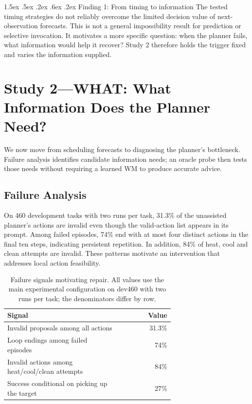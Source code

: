 \documentclass[runningheads]{llncs}
\makeatletter
\renewcommand\paragraph{\@startsection{paragraph}{4}{\z@}%
  {1.5ex \@plus .5ex \@minus .2ex}%
  {.6ex \@plus .2ex}%
  {\normalfont\normalsize\bfseries}}
\makeatother
\begin{document}
\paragraph{Finding 1: From timing to information}
The tested timing strategies do not reliably overcome the limited decision value of next-observation forecasts. This is not a general impossibility result for prediction or selective invocation. It motivates a more specific question: when the planner fails, what information would help it recover? Study 2 therefore holds the trigger fixed and varies the information supplied.

\section{Study 2---WHAT: What Information Does the Planner Need?}\label{sec:what}
We now move from scheduling forecasts to diagnosing the planner's bottleneck. Failure analysis identifies candidate information needs; an oracle probe then tests those needs without requiring a learned WM to produce accurate advice.

\subsection{Failure Analysis}

On 460 development tasks with two runs per task, 31.3\% of the unassisted planner's actions are invalid even though the valid-action list appears in its prompt. Among failed episodes, 74\% end with at most four distinct actions in the final ten steps, indicating persistent repetition. In addition, 84\% of heat, cool and clean attempts are invalid. These patterns motivate an intervention that addresses local action feasibility.

\begin{table}[tbp]
\caption{Failure signals motivating repair. All values use the main experimental configuration on dev460 with two runs per task; the denominators differ by row.}
\label{tab:failure-signals}\centering
\begin{tabular}{p{0.68\linewidth}r}\toprule
Signal & Value\\\midrule
Invalid proposals among all actions & 31.3\%\\
Loop endings among failed episodes & 74\%\\
Invalid actions among heat/cool/clean attempts & 84\%\\
Success conditional on picking up the target & 27\%\\\bottomrule
\end{tabular}
\end{table}
\end{document}
